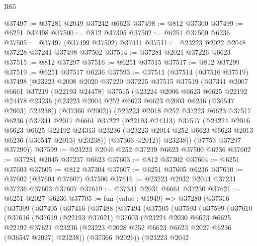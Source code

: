 \begin{lexlean}{R65}
\begin{coremodule}
{@37497 := @37281 @2049 @37242 @6623
@37498 := @812 @37300
@37499 := @6251 @37498
@37500 := @812 @37305
@37502 := @6251 @37500 @6236
@37505 := @37497 (@37499 @37502) @37411
@37511 := @23223 @2022 @2048 @37228 @37241 @37498 @37502
@37514 := @37281 @2021 @37226 @6623
@37515 := @812 @37297
@37516 := @6251 @37515
@37517 := @812 @37299
@37519 := @6251 @37517 @6236
@37593 := @37511
    (@37514
      (@37516 @37519)
      @37498
      (@23223
        @2008
        @2020
        @37220
        @37225
        @37515
        @37519
        (@37341
          @2007
          @6661
          @37219
          (@22193 @24478)
          @37515
          (@23224
            @2006
            @6623
            @6625
            @22192
            @24478
            @23236
            (@23223 @2004 @252 @6623 @6623 @2003 @6236 (@36547 @2003) @23238))
          (@37366 @2002))
        (@23223
          @2018
          @252
          @37223
          @6623
          @37517
          @6236
          (@37341
            @2017
            @6661
            @37222
            (@22193 @24313)
            @37517
            (@23224
              @2016
              @6623
              @6625
              @22192
              @24313
              @23236
              (@23223 @2014 @252 @6623 @6623 @2013 @6236 (@36547 @2013) @23238))
            (@37366 @2012))
          @23238))
      (@7753 @37297 @37299))
@37599 := @23223 @2046 @252 @37239 @6623 @37500 @6236
@37602 := @37281 @2045 @37237 @6623
@37603 := @812 @37302
@37604 := @6251 @37603
@37605 := @812 @37304
@37607 := @6251 @37605 @6236
@37610 := @37602 (@37604 @37607) @37500
@37616 := @23223 @2032 @2044 @37231 @37236 @37603 @37607
@37619 := @37341 @2031 @6661 @37230
@37621 := @6251 @2027 @6236
@37705 := fun (value : @1949) =>
  @37280
    (@37316
      (@37399
        (@37405
          (@37416
            (@37488
              (@37494
                (@37505
                  (@37593
                    (@37599
                      (@37610
                        (@37616
                          (@37619
                            (@22193 @37621)
                            @37603
                            (@23224
                              @2030
                              @6623
                              @6625
                              @22192
                              @37621
                              @23236
                              (@23223 @2028 @252 @6623 @6623 @2027 @6236 (@36547 @2027) @23238))
                            (@37366 @2026))
                          (@23223
                            @2042
}
\end{coremodule}
\end{lexlean}
